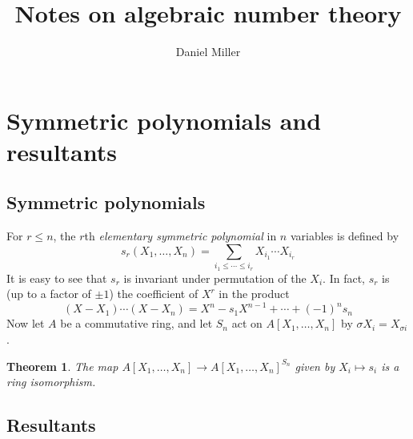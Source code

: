\documentclass{article}
\title{Notes on algebraic number theory}
\author{Daniel Miller} %
\newtheorem{theorem}[definition]{Theorem}
\numberwithin{definition}{subsection}
\begin{document}
\maketitle










\section{Symmetric polynomials and resultants}





\subsection{Symmetric polynomials}

For $r\leqslant n$, the $r$th \emph{elementary symmetric polynomial} in $n$ 
variables is defined by 
\[
  s_r(X_1,\dotsc,X_n) = \sum_{i_1\leqslant \cdots \leqslant i_r} X_{i_1} \dotsm X_{i_r}
\]
It is easy to see that $s_r$ is invariant under permutation of the $X_i$. In 
fact, $s_r$ is (up to a factor of $\pm 1$) the coefficient of $X^r$ in the product 
\[
  (X-X_1) \dotsm (X-X_n) = X^n - s_1 X^{n-1} + \cdots + (-1)^n s_n
\]
Now let $A$ be a commutative ring, and let $S_n$ act on $A[X_1,\dotsc,X_n]$ by 
$\sigma X_i = X_{\sigma i}$. 

\begin{theorem}
The map $A[X_1,\dotsc,X_n] \to A[X_1,\dotsc,X_n]^{S_n}$ given by 
$X_i\mapsto s_i$ is a ring isomorphism. 
\end{theorem}





\subsection{Resultants}
\end{document}
